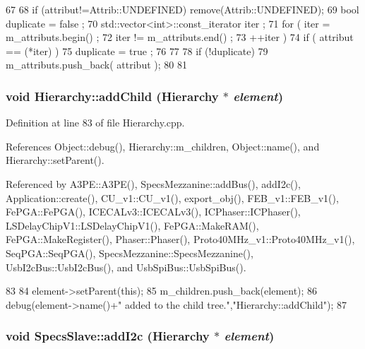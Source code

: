 \begin{DoxyCode}
67                             {
68     if (attribut!=Attrib::UNDEFINED) remove(Attrib::UNDEFINED);
69     bool duplicate = false ;
70     std::vector<int>::const_iterator iter ;
71     for ( iter  = m_attributs.begin() ;
72           iter != m_attributs.end()   ;
73           ++iter ) {
74       if ( attribut == (*iter) ) {
75         duplicate = true ;
76       }
77     }
78     if (!duplicate) {
79       m_attributs.push_back( attribut );
80     }
81   }
\end{DoxyCode}
\hypertarget{classHierarchy_ad677774ff38fcb257c04a3a10d471fac}{
\subsubsection[{addChild}]{\setlength{\rightskip}{0pt plus 5cm}void Hierarchy::addChild ({\bf Hierarchy} $\ast$ {\em element})}}
\label{classHierarchy_ad677774ff38fcb257c04a3a10d471fac}


Definition at line 83 of file Hierarchy.cpp.

References Object::debug(), Hierarchy::m\_\-children, Object::name(), and Hierarchy::setParent().

Referenced by A3PE::A3PE(), SpecsMezzanine::addBus(), addI2c(), Application::create(), CU\_\-v1::CU\_\-v1(), export\_\-obj(), FEB\_\-v1::FEB\_\-v1(), FePGA::FePGA(), ICECALv3::ICECALv3(), ICPhaser::ICPhaser(), LSDelayChipV1::LSDelayChipV1(), FePGA::MakeRAM(), FePGA::MakeRegister(), Phaser::Phaser(), Proto40MHz\_\-v1::Proto40MHz\_\-v1(), SeqPGA::SeqPGA(), SpecsMezzanine::SpecsMezzanine(), UsbI2cBus::UsbI2cBus(), and UsbSpiBus::UsbSpiBus().


\begin{DoxyCode}
83                                           {
84   element->setParent(this);
85   m_children.push_back(element);
86   debug(element->name()+" added to the child tree.","Hierarchy::addChild");
87 }
\end{DoxyCode}
\hypertarget{classSpecsSlave_af462b4d6e716ceb4bd454ad835938737}{
\subsubsection[{addI2c}]{\setlength{\rightskip}{0pt plus 5cm}void SpecsSlave::addI2c ({\bf Hierarchy} $\ast$ {\em element})}}
\label{classSpecsSlave_af462b4d6e716ceb4bd454ad835938737}


